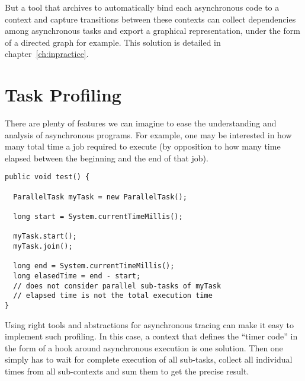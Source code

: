 But a tool that archives to automatically bind each asynchronous code to a context and capture transitions between these contexts can collect dependencies among asynchronous tasks and export a graphical representation, under the form of a directed graph for example. This solution is detailed in chapter~\ref{ch:inpractice}.

\section{Task Profiling}

There are plenty of features we can imagine to ease the understanding and analysis of asynchronous programs. For example, one may be interested in how many total time a job required to execute (by opposition to how many time elapsed between the beginning and the end of that job).

\begin{lstlisting}
public void test() {
  
  ParallelTask myTask = new ParallelTask();

  long start = System.currentTimeMillis();

  myTask.start();
  myTask.join();

  long end = System.currentTimeMillis();
  long elasedTime = end - start;
  // does not consider parallel sub-tasks of myTask
  // elapsed time is not the total execution time
}
\end{lstlisting}

Using right tools and abstractions for asynchronous tracing can make it easy to implement such profiling. In this case, a context that defines the ``timer code'' in the form of a hook around asynchronous execution is one solution. Then one simply has to wait for complete execution of all sub-tasks, collect all individual times from all sub-contexts and sum them to get the precise result.

